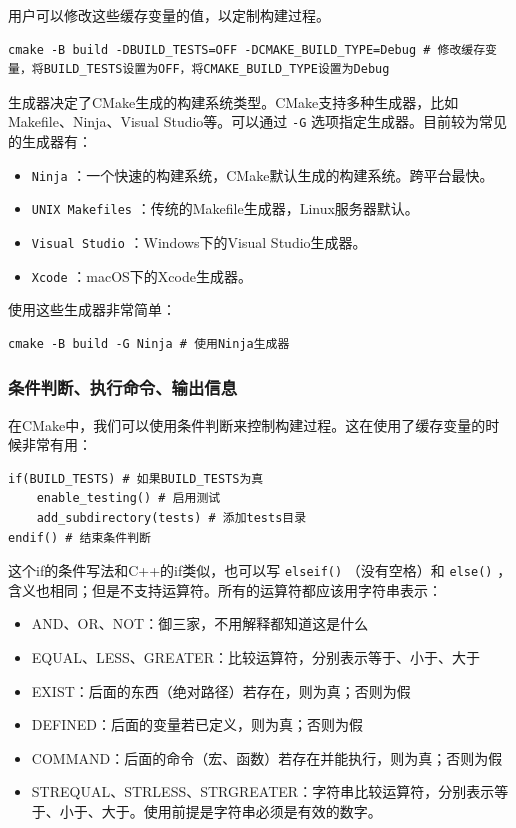 用户可以修改这些缓存变量的值，以定制构建过程。
\begin{verbatim}
cmake -B build -DBUILD_TESTS=OFF -DCMAKE_BUILD_TYPE=Debug # 修改缓存变量，将BUILD_TESTS设置为OFF，将CMAKE_BUILD_TYPE设置为Debug
\end{verbatim}

生成器决定了CMake生成的构建系统类型。CMake支持多种生成器，比如Makefile、Ninja、Visual Studio等。可以通过 \texttt{-G} 选项指定生成器。目前较为常见的生成器有：

\begin{itemize}
    \item  \texttt{Ninja} ：一个快速的构建系统，CMake默认生成的构建系统。跨平台最快。
    \item  \texttt{UNIX Makefiles} ：传统的Makefile生成器，Linux服务器默认。
    \item  \texttt{Visual Studio} ：Windows下的Visual Studio生成器。
    \item  \texttt{Xcode} ：macOS下的Xcode生成器。
\end{itemize}
使用这些生成器非常简单：
\begin{verbatim}
cmake -B build -G Ninja # 使用Ninja生成器
\end{verbatim}

\subsubsection{条件判断、执行命令、输出信息}

在CMake中，我们可以使用条件判断来控制构建过程。这在使用了缓存变量的时候非常有用：
\begin{verbatim}
if(BUILD_TESTS) # 如果BUILD_TESTS为真
    enable_testing() # 启用测试
    add_subdirectory(tests) # 添加tests目录
endif() # 结束条件判断
\end{verbatim}

这个if的条件写法和C++的if类似，也可以写 \texttt{elseif()} （没有空格）和 \texttt{else()} ，含义也相同；但是不支持运算符。所有的运算符都应该用字符串表示：
\begin{itemize}
    \item AND、OR、NOT：御三家，不用解释都知道这是什么
    \item EQUAL、LESS、GREATER：比较运算符，分别表示等于、小于、大于
    \item EXIST：后面的东西（绝对路径）若存在，则为真；否则为假
    \item DEFINED：后面的变量若已定义，则为真；否则为假
    \item COMMAND：后面的命令（宏、函数）若存在并能执行，则为真；否则为假
    \item STREQUAL、STRLESS、STRGREATER：字符串比较运算符，分别表示等于、小于、大于。使用前提是字符串必须是有效的数字。
\end{itemize}

